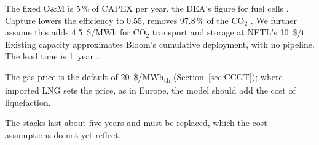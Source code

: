 The fixed O\&M is 5\,\% of CAPEX per year, the DEA's figure for fuel cells \citep{dea}.
Capture lowers the efficiency to 0.55, removes 97.8\,\% of the CO$_2$ \citep{netl2022}.
We further assume this adds 4.5~\$/MWh for CO$_2$ transport and storage at NETL's 10~\$/t .
Existing capacity approximates Bloom's cumulative deployment, with no pipeline.
The lead time is 1~year \citep{eia2023}.

The gas price is the default of 20~\$/MWh\textsubscript{th} (Section~\ref{sec:CCGT}); where imported LNG sets the price, as in Europe, the model should add the cost of liquefaction.

The stacks last about five years and must be replaced, which the cost assumptions do not yet reflect.
